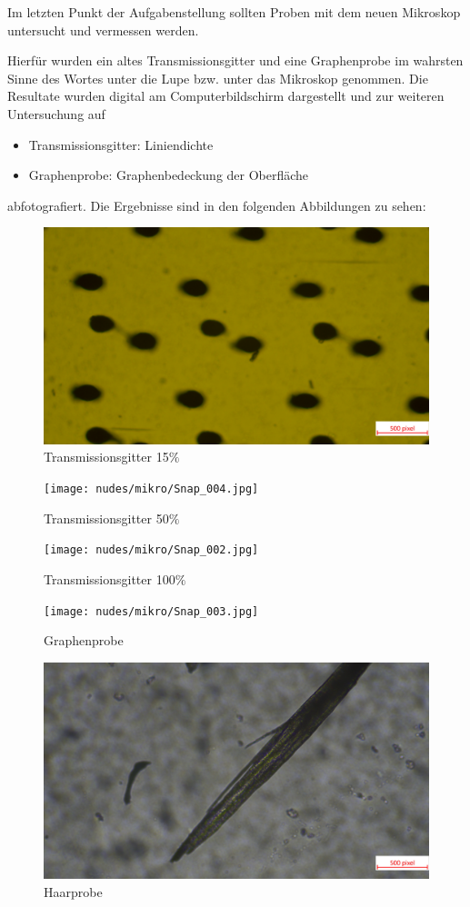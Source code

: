\documentclass[12pt,a4paper,twoside]{article}
\begin{document}
Im letzten Punkt der Aufgabenstellung sollten Proben mit dem neuen Mikroskop untersucht und vermessen werden. \newline

\noindent
Hierfür wurden ein altes Transmissionsgitter und eine Graphenprobe im wahrsten Sinne des Wortes unter die Lupe bzw. unter das Mikroskop genommen.
Die Resultate wurden digital am Computerbildschirm dargestellt und zur weiteren Untersuchung auf

\begin{itemize}
    \item Transmissionsgitter: Liniendichte
    \item Graphenprobe: Graphenbedeckung der Oberfläche

\end{itemize}

\noindent
abfotografiert. Die Ergebnisse sind in den folgenden Abbildungen zu sehen:

\begin{figure}[H]
    \centering
    \includegraphics[width=0.5\linewidth, angle=0]{nudes/mikro/Snap_001.jpg}
    \caption{Transmissionsgitter 15$\%$}
    \label{fig:Transmissionsgitter15}
\end{figure}

\begin{figure}[H]
    \centering
    \texttt{[image: nudes/mikro/Snap\_004.jpg]}
    \caption{Transmissionsgitter 50$\%$}
    \label{fig:Transmissionsgitter50}
\end{figure}

\begin{figure}[H]
    \centering
    \texttt{[image: nudes/mikro/Snap\_002.jpg]}
    \caption{Transmissionsgitter 100$\%$}
    \label{fig:Transmissionsgitter100}
\end{figure}

\begin{figure}[H]
    \centering
    \texttt{[image: nudes/mikro/Snap\_003.jpg]}
    \caption{Graphenprobe}
    \label{fig:graphenprobe}
\end{figure}

\begin{figure}[H]
    \centering
    \includegraphics[width=0.5\linewidth, angle=0]{nudes/mikro/Snap_005.jpg}
    \caption{Haarprobe}
    \label{fig:haarprobe}
\end{figure}
\end{document}
